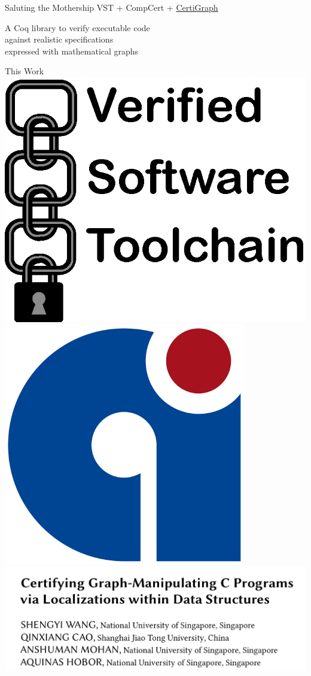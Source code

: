\documentclass[usenames, xcolor=dvipsnames]{beamer}
\begin{document}
\begin{frame}{Saluting the Mothership}
\bigskip
VST + CompCert + \underline{CertiGraph}

\bigskip
A Coq library to verify executable code
\\\hspace{1em}against realistic specifications
\\\hspace{2em}expressed with mathematical graphs

\end{frame}

\begin{frame}{This Work}
\includegraphics[scale=0.09]{vst_logo}
\hspace{2em} \includegraphics[scale=0.12]{compcert_logo}
\hspace{2em} \includegraphics[scale=0.2]{paper_screen}


\end{frame}
\end{document}
